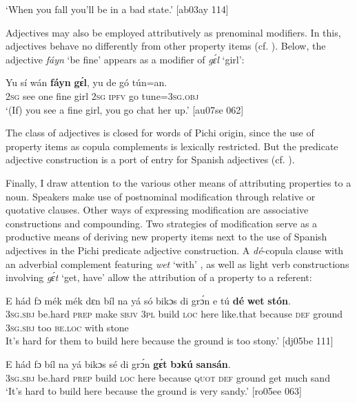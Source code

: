 \glt ‘When you fall you’ll be in a bad state.’ [ab03ay 114]
\z

Adjectives may also be employed attributively as prenominal modifiers. In this, adjectives behave no differently from other property items (cf. ). Below, the adjective \textit{fáyn} ‘be fine’ appears as a modifier of \textit{gɛ́l} ‘girl’: 


\ea%
    \label{ex:key:837}
    \gll Yu  sí  wán    \textbf{fáyn}  \textbf{gɛ́l},  yu  de  gó  tún=an.\\
\textsc{2sg}  see  one    fine    girl  \textsc{2sg}  \textsc{ipfv}  go  tune=\textsc{3sg.obj}\\

\glt ‘(If) you see a fine girl, you go chat her up.’ [au07se 062]
\z

The class of adjectives is closed for words of Pichi origin, since the use of property items as copula complements is lexically restricted. But the predicate adjective construction is a port of entry for Spanish adjectives (cf. ). 


Finally, I draw attention to the various other means of attributing properties to a noun. Speakers make use of postnominal modification through relative or quotative clause{\fff}s. Other ways of expressing modification are associative constructions and compounding{\fff}. Two strategies of modification serve as a productive means of deriving new property items next to the use of Spanish adjectives in the Pichi predicate adjective construction. A \textit{dé}-copula clause with an adverbial complement {\fff}featuring \textit{wet} ‘with’ , as well as light verb constructions involving \textit{gɛ́t} ‘get, have’  allow the attribution of a property to a referent: 



\ea%
    \label{ex:key:838}
    \gll E    hád    fɔ  mék    mék    dɛn  bíl    na  yá    só  bikɔs
di  grɔ́n    e    tú  \textbf{dé}    \textbf{wet}    \textbf{stón}.\\
\textsc{3sg.sbj}  be.hard  \textsc{prep}  make  \textsc{sbjv}    \textsc{3pl}  build  \textsc{loc}  here    like.that  because
\textsc{def}  ground  \textsc{3sg.sbj}  too  \textsc{be.loc}  with    stone\\

\glt It’s hard for them to build here because the ground is too stony.’ [dj05be 111]
\z


\ea%
    \label{ex:key:839}
    \gll E    hád    fɔ  bíl    na  yá    bikɔs  sé    di  grɔ́n
\textbf{gɛ́t}  \textbf{bɔkú}  \textbf{sansán}.\\
\textsc{3sg.sbj}  be.hard  \textsc{prep}  build  \textsc{loc}  here    because  \textsc{quot}    \textsc{def}  ground
get  much  sand\\
\glt ‘It’s hard to build here because the ground is very sandy.’ [ro05ee 063]
\z

